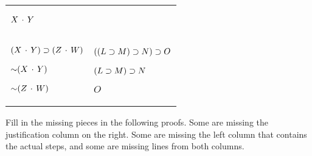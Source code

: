 \begin{exercises}
\begin{longtabu}{X[1]X[1]}
\begin{earg*}
	\itemc[.3]$X \,\cdot\, Y$
	\end{earg*}
\\

\item %
	\begin{earg*}
	\item $(X \,\cdot\, Y) \supset (Z \,\cdot\, W)$
	\item $\mathord{\sim} (X \,\cdot\, Y)$
 
	\itemc[.3]$\mathord{\sim}(Z \,\cdot\, W)$
	\end{earg*}
&

\item %
	\begin{earg*}
	\item $((L \supset M) \supset N) \supset O$
	\item $(L \supset M) \supset N$
 
	\itemc[.3]$O$
	\end{earg*}

\end{longtabu}
\end{exercises}

\vspace{-8pt}

\noindent\problempart \label{pr.justifySLproof} Fill in the missing pieces in the following proofs. Some are missing the justification column on the right. Some are missing the left column that contains the actual steps, and some are missing lines from both columns.

